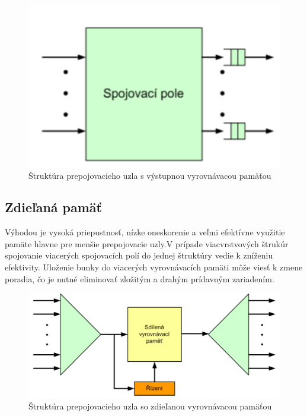 \begin{figure}[ht]
\centering
  \begin{center}
    \includegraphics[scale=0.8]{images/propoj_vystup.png}
  \end{center}
  \caption[Štruktúra prepojovacieho uzla s výstupnou vyrovnávacou pamäťou]{Štruktúra prepojovacieho uzla s výstupnou vyrovnávacou pamäťou}
\end{figure}

\subsection{Zdieľaná pamäť}
Výhodou je vysoká priepustnosť, nízke oneskorenie a veľmi efektívne využitie pamäte hlavne pre menšie prepojovacie uzly.V prípade viacvrstvových štrukúr spojovanie viacerých spojovacích polí do jednej štruktúry vedie k zníženiu efektivity. Uloženie bunky do viacerých vyrovnávacích pamäti môže viesť k zmene poradia, čo je nutné eliminovať zložitým a drahým prídavným zariadením.

\begin{figure}[ht]
\centering
  \begin{center}
    \includegraphics[scale=0.8]{images/propoj_zdiel.png}
  \end{center}
  \caption[Štruktúra prepojovacieho uzla so zdieľanou vyrovnávacou pamäťou]{Štruktúra prepojovacieho uzla so zdieľanou vyrovnávacou pamäťou}
\end{figure}

